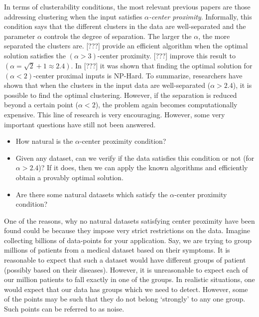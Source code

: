 \documentclass[11pt]{article}
\begin{document}
In terms of clusterability conditions, the most relevant previous papers are those addressing clustering when the input satisfies {\em $\alpha$-center proximity}. Informally, this condition says that the different clusters in the data are well-separated and the parameter $\alpha$ controls the degree of separation. The larger the $\alpha$, the more separated the clusters are. {\color{red} [???]\cite{awasthi2012center}} provide an efficient algorithm when the optimal solution satisfies the $(\alpha > 3)$-center proximity. {\color{red} [???]\cite{balcan2012clustering}} improve this result to $(\alpha = \sqrt{2} + 1 \approx 2.4)$. In {\color{red} [???]\cite{ben2014data}} it was shown that finding the optimal solution for $(\alpha <2)$-center proximal inputs is NP-Hard. To summarize, researchers have shown that when the clusters in the input data are well-separated ($\alpha > 2.4$), it is possible to find the optimal clustering. However, if the separation is reduced beyond a certain point ($\alpha < 2$), the problem again becomes computationally expensive. This line of research is very encouraging. However, some very important questions have still not been answered. 
\begin{itemize}[nolistsep]
\item How natural is the $\alpha$-center proximity condition?
\item Given any dataset, can we verify if the data satisfies this condition or not (for $\alpha > 2.4$)? If it does, then we can apply the known algorithms and efficiently obtain a provably optimal solution. 
\item Are there some natural datasets which satisfy the $\alpha$-center proximity condition? 
\end{itemize}

\vspace{0.1in}\noindent One of the reasons, why no natural datasets satisfying center proximity have been found could be because they impose very strict restrictions on the data. Imagine collecting billions of data-points for your application. Say, we are trying to group millions of patients from a medical dataset based on their symptoms. It is reasonable to expect that such a dataset would have different groups of patient (possibly based on their diseases). However, it is unreasonable to expect each of our million patients to fall exactly in one of the groups. In realistic situations, one would expect that our data has groups which we need to detect. However, some of the points may be such that they do not belong `strongly' to any one group. Such points can be referred to as noise. 
\end{document}
